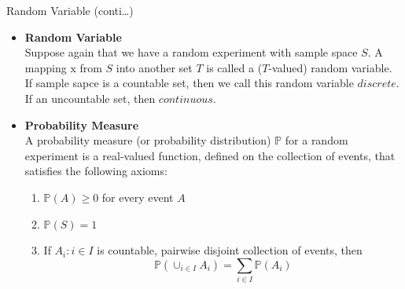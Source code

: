 \documentclass{bredelebeamer}
\begin{document}
\begin{frame}{Random Variable (conti\ldots)}
  \begin{itemize}
    \item\begin{justify}
      \textbf{Random Variable}\\
      Suppose again that we have a random experiment with sample space $S$.
      A mapping $\mathrm{x}$ from $S$ into another set $T$ is called a ($T$-valued)
      random variable. If sample sapce is a countable set, then we call this
      random variable $\mathit{discrete}$. If an uncountable set, then $\mathit{continuous}$.
    \end{justify}
    \item\begin{justify}
      \textbf{Probability Measure}\\
      A probability measure (or probability distribution) $\mathbb{P}$ for a
      random experiment is a real-valued function, defined on the collection of
      events, that satisfies the following axioms:
      \begin{enumerate}
        \item $\mathbb{P}(A) \geq 0$ for every event $A$
        \item $\mathbb{P}(S) = 1$
        \item If $A_i : i \in I$ is countable, pairwise disjoint collection of events, then
        \begin{equation}
          \mathbb{P}(\cup_{i \in I} A_i) = \sum_{i \in I} \mathbb{P}(A_i)
        \end{equation}
      \end{enumerate}
    \end{justify}
  \end{itemize}
\end{frame}
\end{document}
